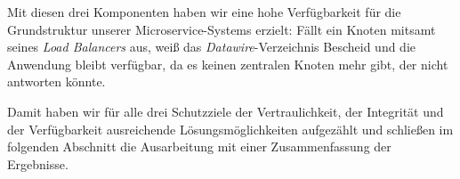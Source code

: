 Mit diesen drei Komponenten haben wir eine hohe Verfügbarkeit für die Grundstruktur unserer Microservice-Systems erzielt: Fällt ein Knoten mitsamt seines \textit{Load Balancers} aus, weiß das \textit{Datawire}-Verzeichnis Bescheid und die Anwendung bleibt verfügbar, da es keinen zentralen Knoten mehr gibt, der nicht antworten könnte.

Damit haben wir für alle drei Schutzziele der Vertraulichkeit, der Integrität und der Verfügbarkeit ausreichende Lösungsmöglichkeiten aufgezählt und schließen im folgenden Abschnitt die Ausarbeitung mit einer Zusammenfassung der Ergebnisse.